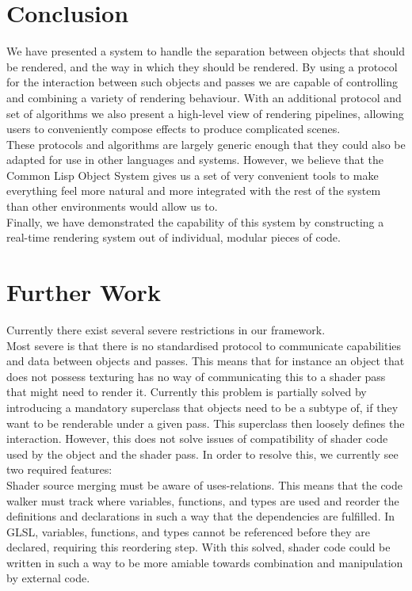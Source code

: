 \documentclass[format=sigconf]{acmart}
\begin{document}
\section{Conclusion}\label{conclusion}
We have presented a system to handle the separation between objects that should be rendered, and the way in which they should be rendered. By using a protocol for the interaction between such objects and passes we are capable of controlling and combining a variety of rendering behaviour. With an additional protocol and set of algorithms we also present a high-level view of rendering pipelines, allowing users to conveniently compose effects to produce complicated scenes. \\

These protocols and algorithms are largely generic enough that they could also be adapted for use in other languages and systems. However, we believe that the Common Lisp Object System gives us a set of very convenient tools to make everything feel more natural and more integrated with the rest of the system than other environments would allow us to. \\

Finally, we have demonstrated the capability of this system by constructing a real-time rendering system out of individual, modular pieces of code.

\section{Further Work}\label{further-work}
Currently there exist several severe restrictions in our framework. \\

Most severe is that there is no standardised protocol to communicate capabilities and data between objects and passes. This means that for instance an object that does not possess texturing has no way of communicating this to a shader pass that might need to render it. Currently this problem is partially solved by introducing a mandatory superclass that objects need to be a subtype of, if they want to be renderable under a given pass. This superclass then loosely defines the interaction. However, this does not solve issues of compatibility of shader code used by the object and the shader pass. In order to resolve this, we currently see two required features: \\

Shader source merging must be aware of uses-relations. This means that the code walker must track where variables, functions, and types are used and reorder the definitions and declarations in such a way that the dependencies are fulfilled. In GLSL, variables, functions, and types cannot be referenced before they are declared, requiring this reordering step. With this solved, shader code could be written in such a way to be more amiable towards combination and manipulation by external code. \\
\end{document}
